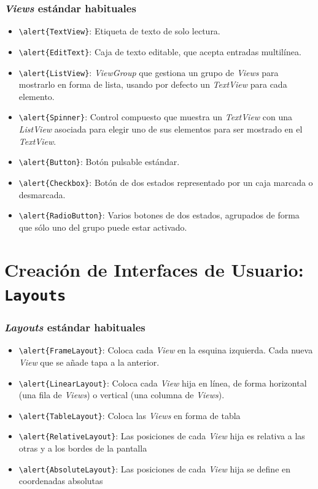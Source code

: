 \documentclass[hyperref={pdfpagelabels=true},ucs]{beamer}
\begin{document}
\begin{frame}[fragile]
\frametitle{\emph{Views} estándar habituales}

\begin{itemize}
\item \Verb|\alert{TextView}|: Etiqueta de texto de solo lectura.
\item \Verb|\alert{EditText}|: Caja de texto editable, que acepta
  entradas multilínea.
\item \Verb|\alert{ListView}|: \emph{ViewGroup} que gestiona un grupo
  de \emph{Views} para mostrarlo en forma de lista, usando por
  defecto un \emph{TextView} para cada elemento.
\item \Verb|\alert{Spinner}|: Control compuesto que muestra un
  \emph{TextView} con una \emph{ListView} asociada para elegir uno de
  sus elementos para ser mostrado en el \emph{TextView}.
\item \Verb|\alert{Button}|: Botón pulsable estándar.
\item \Verb|\alert{Checkbox}|: Botón de dos estados representado por
  un caja marcada o desmarcada.
\item \Verb|\alert{RadioButton}|: Varios botones de dos estados, agrupados de
  forma que sólo uno del grupo puede estar activado.
\end{itemize}

\end{frame}

\section{Creación de Interfaces de Usuario: \texttt{Layouts}}


\begin{frame}[fragile]
\frametitle{\emph{Layouts} estándar habituales}

\begin{itemize}
\item \Verb|\alert{FrameLayout}|: Coloca cada \emph{View} en la
  esquina izquierda. Cada nueva \emph{View} que se añade tapa a la anterior.
\item \Verb|\alert{LinearLayout}|: Coloca cada \emph{View} hija en
  línea, de forma horizontal (una fila de \emph{Views}) o vertical
  (una columna de \emph{Views}).
\item \Verb|\alert{TableLayout}|: Coloca las \emph{Views} en forma de
  tabla
\item \Verb|\alert{RelativeLayout}|: Las posiciones de cada \emph{View}
  hija es relativa a las otras y a los bordes de la pantalla
\item \Verb|\alert{AbsoluteLayout}|: Las posiciones de cada \emph{View}
  hija se define en coordenadas absolutas
\end{itemize}

\end{frame}
\end{document}

